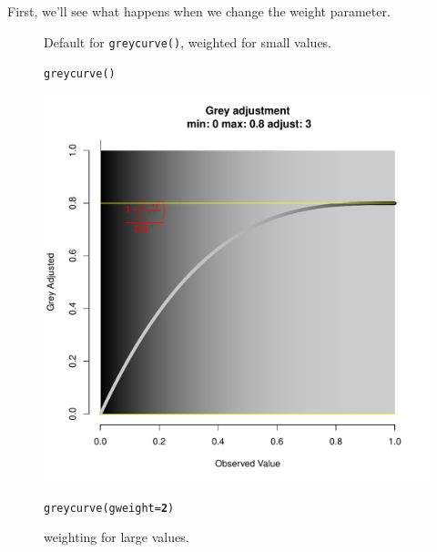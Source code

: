\documentclass[letterpaper]{article}\usepackage[]{graphicx}\usepackage[]{color}
\makeatletter
\newcommand{\hlnum}[1]{\textcolor[rgb]{0.502,0,0.502}{\textbf{#1}}}%
\newcommand{\hlstd}[1]{\textcolor[rgb]{0,0,0}{#1}}%
\newcommand{\hlkwc}[1]{\textcolor[rgb]{0,0.502,0.753}{#1}}%
\newcommand{\hlkwd}[1]{\textcolor[rgb]{0,0.267,0.4}{#1}}%
\newenvironment{kframe}{%
 \def\at@end@of@kframe{}%
 \ifinner\ifhmode%
  \def\at@end@of@kframe{\end{minipage}}%
  \begin{minipage}{\columnwidth}%
 \fi\fi%
 \def\FrameCommand##1{\hskip\@totalleftmargin \hskip-\fboxsep
 \colorbox{shadecolor}{##1}\hskip-\fboxsep
     \hskip-\linewidth \hskip-\@totalleftmargin \hskip\columnwidth}%
 \MakeFramed {\advance\hsize-\width
   \@totalleftmargin\z@ \linewidth\hsize
   \@setminipage}}%
 {\par\unskip\endMakeFramed%
 \at@end@of@kframe}
\newenvironment{knitrout}{}{} %
\makeatother
\begin{document}
First, we'll see what happens when we change the weight parameter.
\begin{figure}[h!]
\begin{minipage}[b]{0.45\linewidth}
\centering
\caption{\footnotesize Default for \texttt{greycurve()}, weighted for small values.}
\begin{knitrout}\footnotesize
{}\color{fgcolor}\begin{kframe}
\begin{alltt}
\hlkwd{greycurve}\hlstd{()}
\end{alltt}
\end{kframe}

{\centering \includegraphics[width=\linewidth]{figure/greycurve_normal} 

}



\end{knitrout}

\end{minipage}
\hspace{0.5cm}
\begin{minipage}[b]{0.45\linewidth}
\centering
\caption{\footnotesize weighting for large values.}
\begin{knitrout}\footnotesize
{}\color{fgcolor}\begin{kframe}
\begin{alltt}
\hlkwd{greycurve}\hlstd{(}\hlkwc{gweight} \hlstd{=} \hlnum{2}\hlstd{)}
\end{alltt}
\end{kframe}


\end{knitrout}
\end{minipage}
\end{figure}
\end{document}
